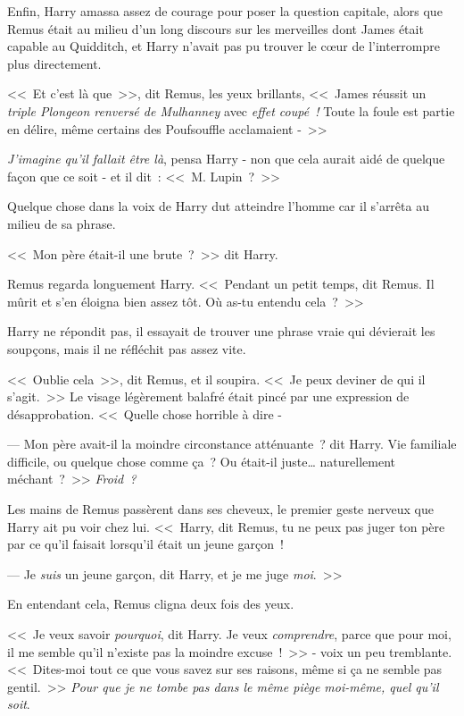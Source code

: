 Enfin, Harry amassa assez de courage pour poser la question capitale, alors que Remus était au milieu d'un long discours sur les merveilles dont James était capable au Quidditch, et Harry n'avait pas pu trouver le cœur de l'interrompre plus directement.

<<~Et c'est là que~>>, dit Remus, les yeux brillants, <<~James réussit un \emph{triple Plongeon renversé de Mulhanney} avec \emph{effet coupé~!} Toute la foule est partie en délire, même certains des Poufsouffle acclamaient -~>>

\emph{J'imagine qu'il fallait être là}, pensa Harry - non que cela aurait aidé de quelque façon que ce soit - et il dit~: <<~M. Lupin~?~>>

Quelque chose dans la voix de Harry dut atteindre l'homme car il s'arrêta au milieu de sa phrase.

<<~Mon père était-il une brute~?~>> dit Harry.

Remus regarda longuement Harry. <<~Pendant un petit temps, dit Remus. Il mûrit et s'en éloigna bien assez tôt. Où as-tu entendu cela~?~>>

Harry ne répondit pas, il essayait de trouver une phrase vraie qui dévierait les soupçons, mais il ne réfléchit pas assez vite.

<<~Oublie cela~>>, dit Remus, et il soupira. <<~Je peux deviner de qui il s'agit.~>> Le visage légèrement balafré était pincé par une expression de désapprobation. <<~Quelle chose horrible à dire -

--- Mon père avait-il la moindre circonstance atténuante~? dit Harry. Vie familiale difficile, ou quelque chose comme ça~? Ou était-il juste… naturellement méchant~?~>> \emph{Froid~?}

Les mains de Remus passèrent dans ses cheveux, le premier geste nerveux que Harry ait pu voir chez lui. <<~Harry, dit Remus, tu ne peux pas juger ton père par ce qu'il faisait lorsqu'il était un jeune garçon~!

--- Je \emph{suis} un jeune garçon, dit Harry, et je me juge \emph{moi}.~>>

En entendant cela, Remus cligna deux fois des yeux.

<<~Je veux savoir \emph{pourquoi}, dit Harry. Je veux \emph{comprendre}, parce que pour moi, il me semble qu'il n'existe pas la moindre excuse~!~>> - voix un peu tremblante. <<~Dites-moi tout ce que vous savez sur ses raisons, même si ça ne semble pas gentil.~>> \emph{Pour que je ne tombe pas dans le même piège moi-même, quel qu'il soit}.

